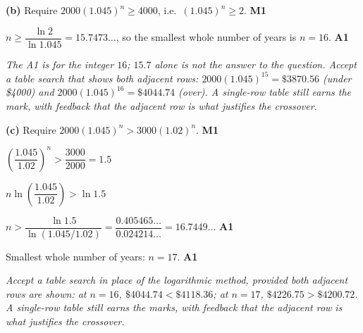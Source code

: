 \documentclass[12pt, twoside]{article}
\begin{document}
\begin{enumerate}[itemsep=0.3cm]
\medskip

\textbf{(b)} Require $2000(1.045)^{n} \ge 4000$, i.e.\
$(1.045)^{n} \ge 2$. \hfill \textbf{M1}

$n \ge \dfrac{\ln 2}{\ln 1.045} = 15.7473\ldots$, so the smallest
whole number of years is $n = 16$. \hfill \textbf{A1}

\emph{The A1 is for the integer $16$; $15.7$ alone is not the answer
to the question. Accept a table search that shows both adjacent
rows: $2000(1.045)^{15} = \$3870.56$ (under \$4000) and
$2000(1.045)^{16} = \$4044.74$ (over). A single-row table still
earns the mark, with feedback that the adjacent row is what
justifies the crossover.}

\medskip

\textbf{(c)} Require $2000(1.045)^{n} > 3000(1.02)^{n}$.
\hfill \textbf{M1}

$\left(\dfrac{1.045}{1.02}\right)^{\!n} > \dfrac{3000}{2000} = 1.5$

$n \ln\!\left(\dfrac{1.045}{1.02}\right) > \ln 1.5$

$n > \dfrac{\ln 1.5}{\ln(1.045/1.02)}
= \dfrac{0.405465\ldots}{0.024214\ldots} = 16.7449\ldots$
\hfill \textbf{A1}

Smallest whole number of years: $n = 17$. \hfill \textbf{A1}

\emph{Accept a table search in place of the logarithmic method,
provided both adjacent rows are shown: at $n = 16$,
$\$4044.74 < \$4118.36$; at $n = 17$, $\$4226.75 > \$4200.72$.
A single-row table still earns the marks, with feedback that the
adjacent row is what justifies the crossover.}

\end{enumerate}
\end{document}
